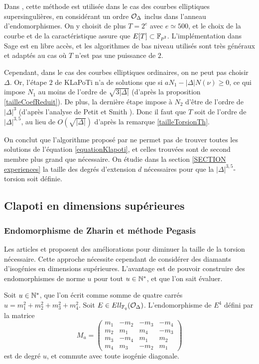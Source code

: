 Dans \cite{KLaPoTi}, cette méthode est utilisée dans le cas des courbes elliptiques supersingulières, en considérant un ordre $\mathcal{O}_{\Delta}$ inclus dans l'anneau d'endomorphismes. On y choisit de plus $T = 2^e$ avec $e\simeq 500$, et le choix de la courbe et de la caractéristique assure que $E[T]\subset \mathbb{F}_{p^2}$. L'implémentation dans Sage est en libre accès, et les algorithmes de bas niveau utilisés sont très généraux et adaptés au cas où $T$ n'est pas une puissance de $2$.
 
Cependant, dans le cas des courbes elliptiques ordinaires, on ne peut pas choisir $\Delta$. Or, l'étape $2$ de KLaPoTi n'a de solutions que si $aN_1 - |\Delta|N(\nu) \geq 0$, ce qui impose $N_1$ au moins de l'ordre de $\sqrt{3|\Delta|}$ (d'après la proposition \ref{tailleCoefReduit}). De plus, la dernière étape impose à $N_2$ d'être de l'ordre de $|\Delta|^3$ (d'après l'analyse de Petit et Smith \cite{PetitSmith}). Donc il faut que $T$ soit de l'ordre de $|\Delta|^{3,5}$, au lieu de $O(\sqrt{|\Delta|})$ d'après la remarque \ref{tailleTorsionTh}.

On conclut que l'algorithme proposé par \cite{KLaPoTi} ne permet pas de trouver toutes les solutions de l'équation \eqref{equationKlapoti}, et celles trouvées sont de second membre plus grand que nécessaire. On étudie dans la section \ref{SECTION experiences} la taille des degrés d'extension $d$ nécessaires pour que la $|\Delta|^{3,5}$-torsion soit définie. 


\subsection{Clapoti en dimensions supérieures}\label{SECTION Clapoti-Pegasis}

\subsubsection{Endomorphisme de Zharin et méthode Pegasis}

Les articles \cite{Clapoti} et \cite{Pegasis} proposent des améliorations pour diminuer la taille de la torsion nécessaire. Cette approche nécessite cependant de considérer des diamants d'isogénies en dimensions supérieures. L'avantage est de pouvoir construire des endomorphismes de norme $u$ pour tout $u\in\mathbb{N}^*$, et que l'on sait évaluer.  

\begin{Prop}\label{EndoDim8}
	Soit $u\in\mathbb{N}^*$, que l'on écrit comme somme de quatre carrés $u = m_1^2 + m_2^2 + m_3^2 + m_4^2$. Soit $E\in Ell_{\mathbb{F}_{q}}(\mathcal{O}_{\Delta})$. L'endomorphisme de $E^4$ défini par la matrice
	\begin{equation*}
		M_u =\begin{pmatrix}
			m_1& -m_2 & -m_3 & -m_4 \\
			m_2& m_1 & m_4 & -m_3 \\
			m_3& -m_4 & m_1 & m_2 \\
			m_4& m_3 & -m_2 & m_1
		\end{pmatrix}
	\end{equation*}
	est de degré $u$, et commute avec toute isogénie diagonale. 
\end{Prop}

